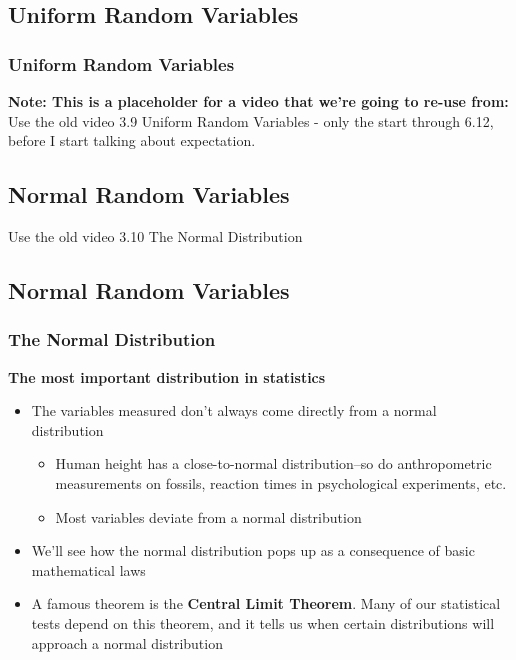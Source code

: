 \documentclass[12pt, block=fill]{beamer}
\begin{document}
 
\subsection{Uniform Random Variables}

\begin{frame}
  \frametitle{Uniform Random Variables}

  \textbf{Note: This is a placeholder for a video that we're going to
    re-use from:} Use the old video 3.9 Uniform Random Variables -
  only the start through 6.12, before I start talking about
  expectation.

\end{frame}

\subsection{Normal Random Variables}

\begin{frame}  
Use the old video 3.10 The Normal Distribution
\end{frame}







\subsection{Normal Random Variables}

\begin{frame}
  \frametitle{The Normal Distribution}
  \textbf{The most important distribution in statistics}
  \begin{itemize}
    \item The variables measured don't always come directly from a normal distribution
    \begin{itemize}
      \item Human height has a close-to-normal distribution--so do anthropometric measurements on fossils, reaction times in psychological experiments, etc.
      \item Most variables deviate from a normal distribution
    \end{itemize}
    \item We'll see how the normal distribution pops up as a consequence of basic mathematical laws
    \item A famous theorem is the \textbf{Central Limit Theorem}. Many of our statistical tests depend on this theorem, and it tells us when certain distributions will approach a normal distribution
  \end{itemize}
\end{frame}
\end{document}
